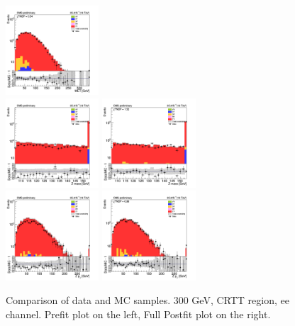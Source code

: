 \begin{figure}[tbp]
\begin{center}
    \includegraphics[width=0.31\textwidth]{figures/ee_300_april18/met_pt_ee_CRTT_FullPostfit_plot_apr18.png}\\
    \includegraphics[width=0.31\textwidth]{figures/ee_300_april18/zmass_high_ee_CRTT_prefit_plot_apr18.png}
    \includegraphics[width=0.31\textwidth]{figures/ee_300_april18/zmass_high_ee_CRTT_FullPostfit_plot_apr18.png}\\
    \includegraphics[width=0.31\textwidth]{figures/ee_300_april18/zpt0_ee_CRTT_prefit_plot_apr18.png}
    \includegraphics[width=0.31\textwidth]{figures/ee_300_april18/zpt0_ee_CRTT_FullPostfit_plot_apr18.png}\\
    \caption{Comparison of data and MC samples. 300 GeV, CRTT region, ee channel. Prefit plot on the left,           Full Postfit plot on the right.}
    \label{fig:MCcomparisons_ee_low_CRTT_2}
  \end{center}
\end{figure}




